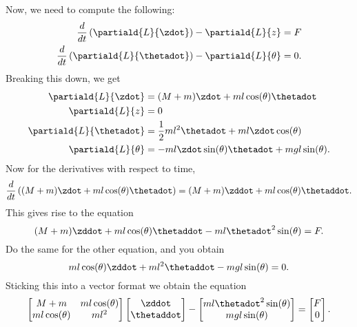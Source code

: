 \documentclass[10pt]{article}
\begin{document}
Now, we need to compute the following:
\begin{equation}
  \begin{split}
    \frac{d}{dt}\left(\partiald{L}{\zdot}\right) -\partiald{L}{z} &=
    F\\
    \frac{d}{dt}\left(\partiald{L}{\thetadot}\right)
    - \partiald{L}{\theta} & = 0. %
  \end{split}
\end{equation}
Breaking this down, we get
\begin{equation}
  \begin{split}
    \partiald{L}{\zdot} &= (M+m)\zdot + ml\cos(\theta)\thetadot\\
    \partiald{L}{z} &= 0\\
    \partiald{L}{\thetadot} &= \frac{1}{2}ml^2\thetadot +
    ml\zdot\cos(\theta)\\ 
    \partiald{L}{\theta} &= -ml\zdot\sin(\theta)\thetadot +
    mgl\sin(\theta).\\ 
  \end{split}
\end{equation}
Now for the derivatives with respect to time,
\begin{equation}
  \frac{d}{dt}\left((M+m)\zdot + ml\cos(\theta)\thetadot\right) =
  (M+m)\zddot + ml\cos(\theta)\thetaddot. 
\end{equation}
This gives rise to the equation
\begin{equation}
 (M+m)\zddot + ml\cos(\theta)\thetaddot  - ml\thetadot^2\sin(\theta) = F.
\end{equation}
Do the same for the other equation, and you obtain
\begin{equation}
  ml\cos(\theta)\zddot + ml^2\thetaddot - mgl\sin(\theta) = 0.
\end{equation}
Sticking this into a vector format we obtain the equation
\begin{equation}
  \begin{bmatrix}
    M+m & ml\cos(\theta)\\ ml\cos(\theta) & ml^2
  \end{bmatrix}
  \begin{bmatrix}
    \zddot\\ \thetaddot
  \end{bmatrix}
  -
  \begin{bmatrix}
    ml\thetadot^2\sin(\theta)\\ mgl\sin(\theta)
  \end{bmatrix}
  =
  \begin{bmatrix}
    F \\ 0
  \end{bmatrix}.
\end{equation}
\end{document}
